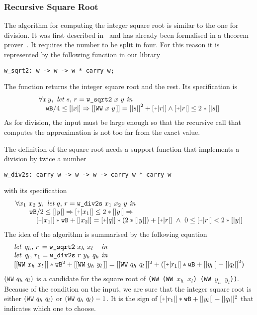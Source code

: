 \subsubsection{Recursive Square Root}

The algorithm for computing the integer square root is similar to the one for division.
It was first described in~\cite{RecSqrt} and has already been formalised in a 
theorem prover~\cite{BerMagZim02}. It requires the number to be split
in four. For this reason it is represented by the following function in our
library
\begin{verbatim}
w_sqrt2: w -> w -> w * carry w;
\end{verbatim}
The function returns the integer square root and the rest.
Its specification is
$$\begin{array}{l}
\forall x\, y,\,\, \textit{let}\,\, s,\, r = \texttt{w\_sqrt2}\,\, x\,\, y\,\, \textit{in}\\
\hskip10pt \wB / 4 \le [|x|] \Rightarrow [[\WW x y]] = {[|s|]} ^ 2 + \ICP{r} \land \ICP{r} \le 2 * [|s|]
\end{array}
$$
As for division, the input must be large enough so that the recursive call
that computes the approximation is not too far from the exact value. 

The definition of the square root needs a support function that implements a division
by twice a number
\begin{verbatim}
w_div2s: carry w -> w -> w -> carry w * carry w
\end{verbatim}
with its specification
$$\begin{array}{l}
\forall x_1\,\, x_2\,\, y, \,\, \textit{let}\,\, q,\, r = \texttt{w\_div2s}\,\, x_1\,\, x_2\,\, y\,\, \textit{in}\\
\hskip20pt \wB / 2 \le [|y|] \Rightarrow \ICP{x_1} \le 2 * [|y|] \Rightarrow\\
\hskip30pt \ICP{x_1} * \wB + [|x_2|] = \ICP{q} *  (2 * [|y|]) + \ICP{r} \,\, \land\,\, 0 \le \ICP{r} < 2 * [|y|]
\end{array}
$$
The idea of the algorithm is summarised by the following equation
$$\begin{array}{l}
\textit{let}\,\,\, {q_h} ,\, r\, = \texttt{w\_sqrt2}\,\, {x_h}\,\, {x_l}\quad\, \textit{in}\\
\textit{let}\,\,\, {q_l} ,\, r_1 = \texttt{w\_div2s}\,\, r\,\, {y_h}\,\, {q_h}\,\, \textit{in}\\
{[[\WW {x_h} {x_l}]]} * \wB ^ 2 + [[\WW {y_h} {y_l}]] =
    [[\WW {q_h} {q_l}]] ^ 2 + (\ICP{r_1} * \wB + [|{y_l}|] - {[|q_l|]} ^ 2) \\
\end{array}
$$
$(\texttt{WW}\,\,q_h\,\,q_l\,\!)$ is a candidate
for the square root of {\tt (WW (WW $x_h$ $x_l$) (WW $y_h$ $y_l$))}. Because of the condition on
the input, we are sure that the integer square root is either 
$(\texttt{WW}\,\,q_h\,\,q_l\,\!)$ or
$(\texttt{WW}\,\,q_h\,\,q_l\,\!) - 1$. It is the sign of $\ICP{r_1} * \wB + 
[|{y_l}|] - [|q_l|] ^ 2$ that indicates which one to choose. 
